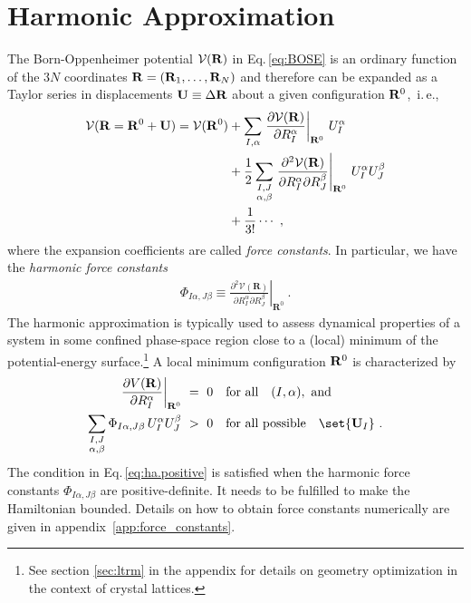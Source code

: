 \section{Harmonic Approximation}
\label{sec:HA}
The Born-Oppenheimer potential $\mathcal V ({\bf R})$ in Eq.\,\eqref{eq:BOSE} is an ordinary function of the $3 N$ coordinates ${\bf R} = ({\bf R}_1, \ldots, {\bf R}_{N})$ and therefore can be expanded as a Taylor series in displacements ${\bf U} \equiv \Delta {\bf R}$ about a given configuration ${\bf R}^0$,~i.\,e.,
\begin{align}
\begin{split}
  \mathcal V ({\bf R} = {\bf R}^0 + {\bf U})
    = \mathcal V ({\bf R}^0)
    &+ \sum_{I, \alpha} 
      \left. \frac{\partial \mathcal V({\bf R})}{\partial R^\alpha_I} 
      \right\vert_{{\bf R}^0}
    \,U^\alpha_I
    \\
    &
    + \frac{1}{2}
    \sum_{\substack{I, J \\ \alpha, \beta}}
    \left.\frac{\partial^{2} \mathcal{V}(\mathbf{R})}{\partial R_{I}^{\alpha} \partial R_{J}^{\beta}}\right|_{\mathbf{R}^{0}}
    \, U_I^\alpha U_J^\beta
    \\
    &+\frac{1}{3!}\cdots ~,
\end{split}
\end{align}
where the expansion coefficients are called \emph{force constants}. In particular, we have the \emph{harmonic force constants}
\begin{align}
  \Phi_{I \alpha, J \beta}
  \equiv \left.\frac{\partial^{2} \mathcal{V}(\mathbf{R})}{\partial R_{I}^{\alpha} \partial R_{J}^{\beta}}\right|_{\mathbf{R}^{0}}~.
  \label{eq:FC2}
\end{align}
The harmonic approximation is typically used to assess dynamical properties of a system in some confined phase-space region close to a (local) minimum of the potential-energy surface.\footnote{See section \ref{sec:ltrm} in the appendix for details on geometry optimization in the context of crystal lattices.} A local minimum configuration ${\bf R}^0$ is characterized by
\begin{align}
	\left. \frac{\partial V({\bf R})}{\partial R^\alpha_I} 
	\right\vert_{{\bf R}^0} 
		&~=~ 0 \quad\text{for all}\quad (I, \alpha),~\text{and} \\
	\sum_{\substack{I, J \\ \alpha, \beta}}
	\Phi_{I \alpha, J \beta}
	\, U_I^\alpha U_J^\beta
		&~>~ 0 \quad\text{for all possible}\quad \set{{\bf U}_I}~.
	\label{eq:ha.positive}
\end{align}
The condition in Eq.\,\eqref{eq:ha.positive} is satisfied when the harmonic force constants $\Phi_{I \alpha, J \beta}$ are positive-definite. It needs to be fulfilled to make the Hamiltonian bounded. Details on how to obtain force constants numerically are given in appendix~\ref{app:force_constants}.

